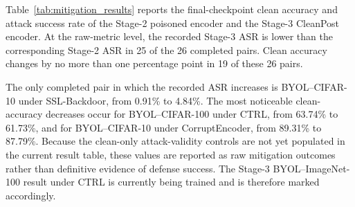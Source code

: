 \documentclass[10pt,journal]{IEEEtran}
\begin{document}
Table~\ref{tab:mitigation_results} reports the final-checkpoint clean
accuracy and attack success rate of the Stage-2 poisoned encoder and the
Stage-3 CleanPost encoder. At the raw-metric level, the recorded Stage-3
ASR is lower than the corresponding Stage-2 ASR in 25 of the 26 completed
pairs. Clean accuracy changes by no more than one percentage point in 19
of these 26 pairs.

The only completed pair in which the recorded ASR increases is
BYOL--CIFAR-10 under SSL-Backdoor, from 0.91\% to 4.84\%. The most
noticeable clean-accuracy decreases occur for BYOL--CIFAR-100 under CTRL,
from 63.74\% to 61.73\%, and for BYOL--CIFAR-10 under CorruptEncoder,
from 89.31\% to 87.79\%. Because the clean-only attack-validity controls
are not yet populated in the current result table, these values are
reported as raw mitigation outcomes rather than definitive evidence of
defense success. The Stage-3 BYOL--ImageNet-100 result under CTRL is
currently being trained and is therefore marked accordingly.
\end{document}
